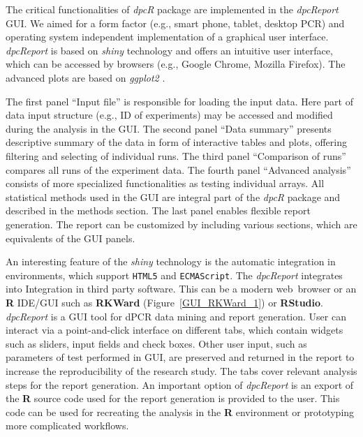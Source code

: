 \documentclass[a4,center,fleqn]{NAR}
\begin{document}
The critical functionalities of \textit{dpcR} package are implemented in the 
\textit{dpcReport} GUI. We aimed for a form factor (e.g., smart phone, tablet, 
desktop PCR) and operating system independent implementation of a graphical user 
interface. \textit{dpcReport} is based on \textit{shiny} technology and offers 
an intuitive user interface, which can be accessed by browsers (e.g., Google 
Chrome, Mozilla Firefox). The advanced plots are based on \textit{ggplot2} 
\cite{Wickham_2009}.

The first panel ``Input file'' is responsible for loading the input data. Here 
part of data input structure (e.g., ID of experiments) may be accessed and 
modified during the analysis in the GUI. The second panel ``Data summary'' 
presents descriptive summary of the data in form of interactive tables and 
plots, offering filtering and selecting of individual runs. The third panel 
``Comparison of runs'' compares all runs of the experiment data. The fourth 
panel ``Advanced analysis'' consists of more specialized functionalities as 
testing individual arrays. All statistical methods used in the GUI are integral 
part of the \textit{dpcR} package and described in the methods section. The last 
panel enables flexible report generation. The report can be customized by 
including various sections, which are equivalents of the GUI panels.

An interesting feature of the \textit{shiny} 
technology is the automatic integration in environments, which support 
\texttt{HTML5} and \texttt{ECMAScript}. The \textit{dpcReport} integrates into 
Integration in third party software. This can be a modern web~browser or an 
\textbf{R} IDE/GUI such as \textbf{RKWard} (Figure~\ref{GUI_RKWard_1}) 
\cite{rodiger_rkward_2012} or \textbf{RStudio}. \textit{dpcReport} is a GUI tool 
for dPCR data mining and report generation. User can interact via a 
point-and-click interface on different tabs, which contain widgets such as 
sliders, input fields and check boxes. Other 
user input, such as parameters of test performed in GUI, are preserved and 
returned in the report to increase the reproducibility of the research study. 
The tabs cover relevant analysis steps for the report generation. An important 
option of \textit{dpcReport} is an export of the \textbf{R} source code used for 
the report generation is provided to the user. This code can be used for 
recreating the analysis in the \textbf{R} environment or prototyping more 
complicated workflows.
\end{document}
